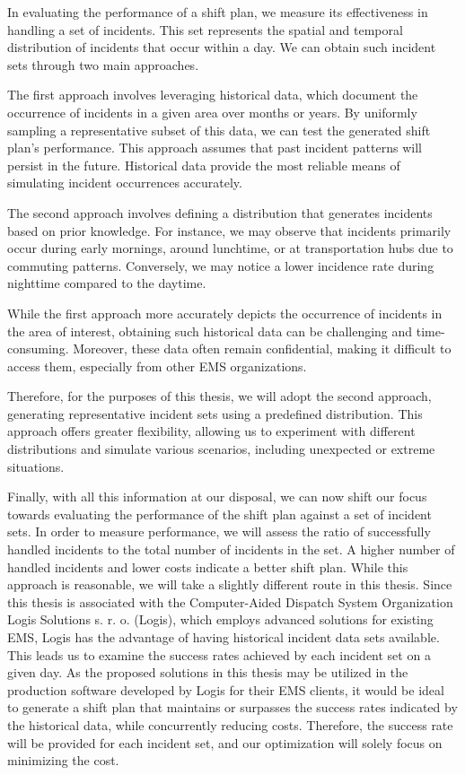 In evaluating the performance of a shift plan, we measure its effectiveness in
handling a set of incidents. This set represents the spatial and temporal
distribution of incidents that occur within a day. We can obtain such incident
sets through two main approaches.

The first approach involves leveraging historical data, which document the
occurrence of incidents in a given area over months or years. By uniformly
sampling a representative subset of this data, we can test the generated shift
plan's performance. This approach assumes that past incident patterns will
persist in the future. Historical data provide the most reliable means of
simulating incident occurrences accurately.

The second approach involves defining a distribution that generates incidents
based on prior knowledge. For instance, we may observe that incidents primarily
occur during early mornings, around lunchtime, or at transportation hubs due to
commuting patterns. Conversely, we may notice a lower incidence rate during
nighttime compared to the daytime.

While the first approach more accurately depicts the occurrence of incidents in
the area of interest, obtaining such historical data can be challenging and
time-consuming. Moreover, these data often remain confidential, making it
difficult to access them, especially from other EMS organizations.

Therefore, for the purposes of this thesis, we will adopt the second approach,
generating representative incident sets using a predefined distribution. This
approach offers greater flexibility, allowing us to experiment with different
distributions and simulate various scenarios, including unexpected or extreme
situations.

Finally, with all this information at our disposal, we can now shift our focus
towards evaluating the performance of the shift plan against a set of incident
sets. In order to measure performance, we will assess the ratio of successfully
handled incidents to the total number of incidents in the set. A higher number
of handled incidents and lower costs indicate a better shift plan. While this
approach is reasonable, we will take a slightly different route in this thesis.
Since this thesis is associated with the Computer-Aided Dispatch System
Organization Logis Solutions s. r. o. (Logis), which employs advanced solutions
for existing EMS, Logis has the advantage of having historical incident data
sets available. This leads us to examine the success rates achieved by each
incident set on a given day. As the proposed solutions in this thesis may be
utilized in the production software developed by Logis for their EMS clients,
it would be ideal to generate a shift plan that maintains or surpasses the
success rates indicated by the historical data, while concurrently reducing
costs. Therefore, the success rate will be provided for each incident set, and
our optimization will solely focus on minimizing the cost.

